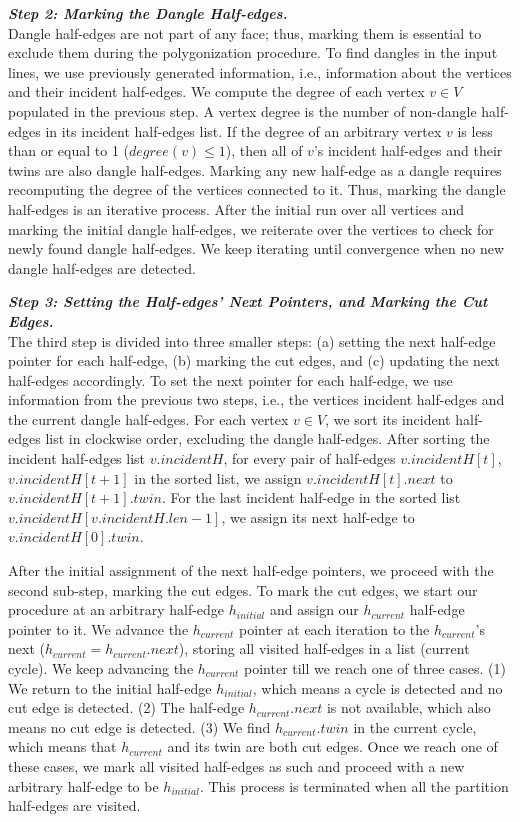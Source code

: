 \vspace{4pt}
\textit{\textbf{Step 2: Marking the Dangle Half-edges.}}
\\
Dangle half-edges are not part of any face; thus, marking them is essential to exclude them during the polygonization procedure. To find dangles in the input lines, we use previously generated information, i.e., information about the vertices and their incident half-edges. 
We compute the degree of each vertex $v \in V$ populated in the previous step. A vertex degree is the number of non-dangle half-edges in its incident half-edges list. If the degree of an arbitrary vertex $v$ is less than or equal to 1 ($degree(v) \le 1$), then all of $v$'s incident half-edges and their twins are also dangle half-edges. 
Marking any new half-edge as a dangle requires recomputing the degree of the vertices connected to it. 
Thus, marking the dangle half-edges is an iterative process. After the initial run over all vertices and marking the initial dangle half-edges, we reiterate over the vertices to check for newly found dangle half-edges. We keep iterating until convergence when no new dangle half-edges are detected.


\vspace{4pt}
\textit{\textbf{Step 3: Setting the Half-edges' Next Pointers, and Marking the Cut Edges.}}
\\
The third step is divided into three smaller steps: (a) setting the next half-edge pointer for each half-edge, (b) marking the cut edges, and (c) updating the next half-edges accordingly.
To set the next pointer for each half-edge, we use information from the previous two steps, i.e., the vertices incident half-edges and the current dangle half-edges.
For each vertex $v \in V$, we sort its incident half-edges list in clockwise order, excluding the dangle half-edges. 
After sorting the incident half-edges list $v.incidentH$, for every pair of half-edges $v.incidentH[t]$, $v.incidentH[t+1]$ in the sorted list, we assign $v.incidentH[t].next$ to $v.incidentH[t+1].twin$. For the last incident half-edge in the sorted list $v.incidentH[v.incidentH.len-1]$, we assign its next half-edge to $v.incidentH[0].twin$.


After the initial assignment of the next half-edge pointers, we proceed with the second sub-step, marking the cut edges.
To mark the cut edges, we start our procedure at an arbitrary half-edge $h_{initial}$ and assign our $h_{current}$ half-edge pointer to it. We advance the $h_{current}$ pointer at each iteration to the $h_{current}$'s next ($h_{current} = h_{current}.next$), storing all visited half-edges in a list (current cycle). We keep advancing the $h_{current}$ pointer till we reach one of three cases.
(1) We return to the initial half-edge $h_{initial}$, which means a cycle is detected and no cut edge is detected.
(2) The half-edge $h_{current}.next$ is not available, which also means no cut edge is detected.
(3) We find $h_{current}.twin$ in the current cycle, which means that $h_{current}$ and its twin are both cut edges. 
Once we reach one of these cases, we mark all visited half-edges as such and proceed with a new arbitrary half-edge to be $h_{initial}$.
This process is terminated when all the partition half-edges are visited.


